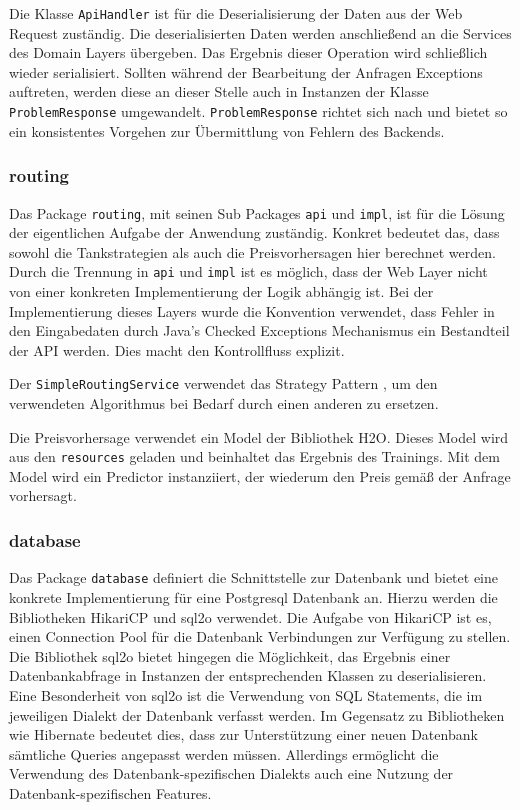 \documentclass[
ngerman          %
,a4paper          %
,11pt
,pdftex
]{report}
\begin{document}
Die Klasse \texttt{ApiHandler} ist für die Deserialisierung der Daten aus der Web Request zuständig. Die deserialisierten Daten werden anschließend an die Services des Domain Layers übergeben. Das Ergebnis dieser Operation wird schließlich wieder serialisiert. Sollten während der Bearbeitung der Anfragen Exceptions auftreten, werden diese an dieser Stelle auch in Instanzen der Klasse \texttt{ProblemResponse} umgewandelt. \texttt{ProblemResponse} richtet sich nach \cite{nottingham} und bietet so ein konsistentes Vorgehen zur Übermittlung von Fehlern des Backends.

\subsubsection{routing}
\label{sec:routing}

Das Package \texttt{routing}, mit seinen Sub Packages \texttt{api} und \texttt{impl}, ist für die Lösung der eigentlichen Aufgabe der Anwendung zuständig. Konkret bedeutet das, dass sowohl die Tankstrategien als auch die Preisvorhersagen hier berechnet werden. Durch die Trennung in \texttt{api} und \texttt{impl} ist es möglich, dass der Web Layer nicht von einer konkreten Implementierung der Logik abhängig ist. Bei der Implementierung dieses Layers wurde die Konvention verwendet, dass Fehler in den Eingabedaten durch Java's Checked Exceptions Mechanismus ein Bestandteil der \ac{API} werden. Dies macht den Kontrollfluss explizit.

Der \texttt{SimpleRoutingService} verwendet das Strategy Pattern \cite{gof}, um den verwendeten Algorithmus bei Bedarf durch einen anderen zu ersetzen.

Die Preisvorhersage verwendet ein Model der Bibliothek H2O. Dieses Model wird aus den \texttt{resources} geladen und beinhaltet das Ergebnis des Trainings. Mit dem Model wird ein Predictor instanziiert, der wiederum den Preis gemäß der Anfrage vorhersagt.

\subsubsection{database}
\label{sec:database}

Das Package \texttt{database} definiert die Schnittstelle zur Datenbank und bietet eine konkrete Implementierung für eine Postgresql Datenbank an. Hierzu werden die Bibliotheken HikariCP und sql2o verwendet. Die Aufgabe von HikariCP ist es, einen Connection Pool für die Datenbank Verbindungen zur Verfügung zu stellen. Die Bibliothek sql2o bietet hingegen die Möglichkeit, das Ergebnis einer Datenbankabfrage in Instanzen der entsprechenden Klassen zu deserialisieren. Eine Besonderheit von sql2o ist die Verwendung von SQL Statements, die im jeweiligen Dialekt der Datenbank verfasst werden. Im Gegensatz zu Bibliotheken wie Hibernate bedeutet dies, dass zur Unterstützung einer neuen Datenbank sämtliche Queries angepasst werden müssen. Allerdings ermöglicht die Verwendung des Datenbank-spezifischen Dialekts auch eine Nutzung der Datenbank-spezifischen Features.
\end{document}
